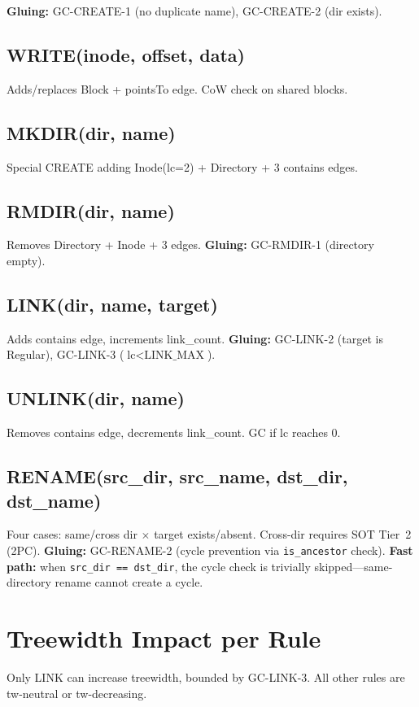 \documentclass[11pt,a4paper,twoside]{report}
\theoremstyle{definition}
\begin{document}
\textbf{Gluing:} GC-CREATE-1 (no duplicate name), GC-CREATE-2 (dir exists).

\subsection{WRITE(inode, offset, data)}
Adds/replaces Block + pointsTo edge. CoW check on shared blocks.

\subsection{MKDIR(dir, name)}
Special CREATE adding Inode(lc=2) + Directory + 3 contains edges.

\subsection{RMDIR(dir, name)}
Removes Directory + Inode + 3 edges. \textbf{Gluing:} GC-RMDIR-1 (directory empty).

\subsection{LINK(dir, name, target)}
Adds contains edge, increments link\_count. \textbf{Gluing:} GC-LINK-2 (target is Regular), GC-LINK-3 ($\text{lc} < \text{LINK\_MAX}$).

\subsection{UNLINK(dir, name)}
Removes contains edge, decrements link\_count. GC if lc reaches 0.

\subsection{RENAME(src\_dir, src\_name, dst\_dir, dst\_name)}
Four cases: same/cross dir $\times$ target exists/absent.  Cross-dir requires SOT Tier~2 (2PC).
\textbf{Gluing:} GC-RENAME-2 (cycle prevention via \texttt{is\_ancestor} check).
\textbf{Fast path:} when \texttt{src\_dir == dst\_dir}, the cycle check is trivially
skipped---same-directory rename cannot create a cycle.

\section{Treewidth Impact per Rule}
Only LINK can increase treewidth, bounded by GC-LINK-3. All other rules are tw-neutral or tw-decreasing.
\end{document}
